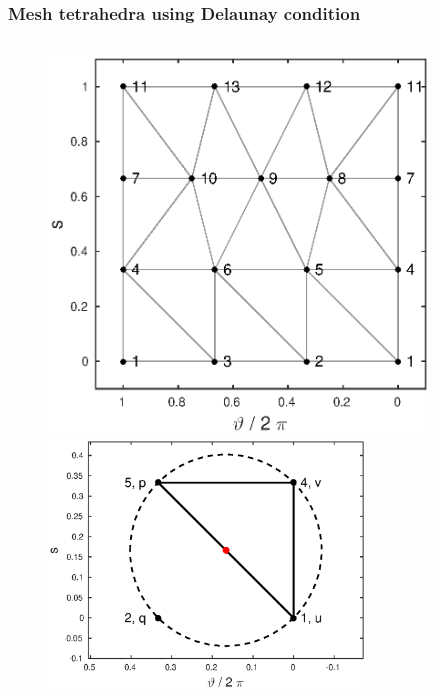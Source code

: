 \documentclass{beamer}
\begin{document}
\begin{frame}
\frametitle{Mesh tetrahedra using Delaunay condition}
\vspace{-1.5cm}
\begin{columns}[onlytextwidth]
\begin{column}{0.5\textwidth}
	\begin{center}
		\begin{figure}
			\includegraphics[trim={0cm 0cm 0cm 0cm},clip,width=0.9\textwidth]{FIGURES/Delaunay_Connected_PrismFaces.eps}
			\includegraphics[trim={0cm 0cm 0cm 0cm},clip,width=0.75\textwidth]{FIGURES/uvpq_Delaunay.eps}
		\end{figure}
	\end{center}
\end{column}

\end{columns}
\end{frame}
\end{document}
